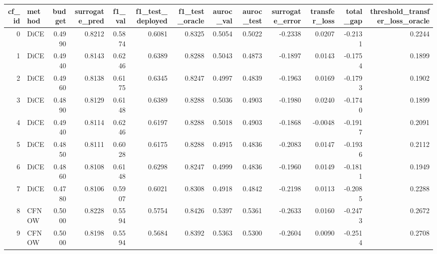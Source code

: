 \begin{tabular}{rlrrrrrrrrrrr}
\toprule
 cf\_id & method &  budget &  surrogate\_pred &  f1\_val &  f1\_test\_deployed &  f1\_test\_oracle &  auroc\_val &  auroc\_test &  surrogate\_error &  transfer\_loss &  total\_gap &  threshold\_transfer\_loss\_oracle \\
\midrule
     0 &   DiCE &  0.4990 &          0.8212 &  0.5874 &            0.6081 &          0.8325 &     0.5054 &      0.5022 &          -0.2338 &         0.0207 &    -0.2131 &                          0.2244 \\
     1 &   DiCE &  0.4940 &          0.8143 &  0.6246 &            0.6389 &          0.8288 &     0.5043 &      0.4873 &          -0.1897 &         0.0143 &    -0.1754 &                          0.1899 \\
     2 &   DiCE &  0.4960 &          0.8138 &  0.6175 &            0.6345 &          0.8247 &     0.4997 &      0.4839 &          -0.1963 &         0.0169 &    -0.1793 &                          0.1902 \\
     3 &   DiCE &  0.4890 &          0.8129 &  0.6148 &            0.6389 &          0.8288 &     0.5036 &      0.4903 &          -0.1980 &         0.0240 &    -0.1740 &                          0.1899 \\
     4 &   DiCE &  0.4940 &          0.8114 &  0.6246 &            0.6197 &          0.8288 &     0.5018 &      0.4903 &          -0.1868 &        -0.0048 &    -0.1917 &                          0.2091 \\
     5 &   DiCE &  0.4850 &          0.8111 &  0.6028 &            0.6175 &          0.8288 &     0.4915 &      0.4836 &          -0.2083 &         0.0147 &    -0.1936 &                          0.2112 \\
     6 &   DiCE &  0.4860 &          0.8108 &  0.6148 &            0.6298 &          0.8247 &     0.4999 &      0.4836 &          -0.1960 &         0.0149 &    -0.1811 &                          0.1949 \\
     7 &   DiCE &  0.4780 &          0.8106 &  0.5907 &            0.6021 &          0.8308 &     0.4918 &      0.4842 &          -0.2198 &         0.0113 &    -0.2085 &                          0.2288 \\
     8 &  CFNOW &  0.5000 &          0.8228 &  0.5594 &            0.5754 &          0.8426 &     0.5397 &      0.5361 &          -0.2633 &         0.0160 &    -0.2473 &                          0.2672 \\
     9 &  CFNOW &  0.5000 &          0.8198 &  0.5594 &            0.5684 &          0.8392 &     0.5363 &      0.5300 &          -0.2604 &         0.0090 &    -0.2514 &                          0.2708 \\

\end{tabular}
